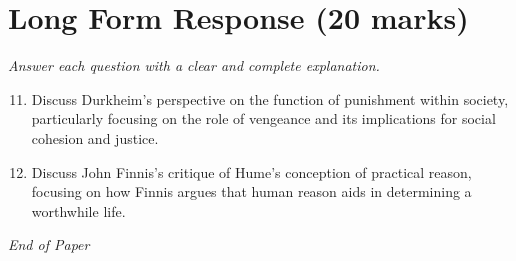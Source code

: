 \documentclass[12pt]{article}
\begin{document}
\section*{Long Form Response (20 marks)}
\textit{Answer each question with a clear and complete explanation.}
\begin{enumerate}[label=\arabic*.]
\setcounter{enumi}{10}
\item Discuss Durkheim's perspective on the function of punishment within society, particularly focusing on the role of vengeance and its implications for social cohesion and justice.
\item Discuss John Finnis's critique of Hume's conception of practical reason, focusing on how Finnis argues that human reason aids in determining a worthwhile life.
\end{enumerate}

\vfill
\noindent\textit{End of Paper}
\end{document}
